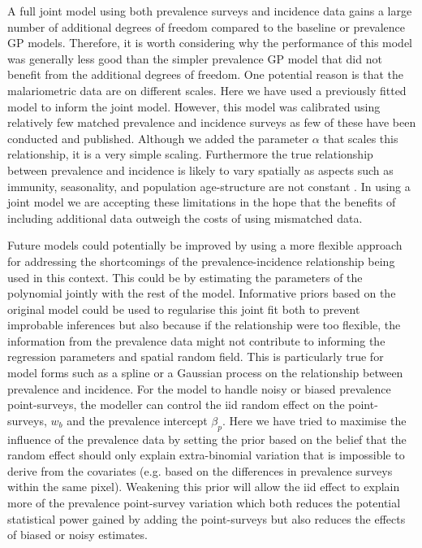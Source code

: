 \documentclass{statsoc}
\begin{document}

A full joint model using both prevalence surveys and incidence data gains a large number of additional degrees of freedom compared to the baseline or prevalence GP models.
Therefore, it is worth considering why the performance of this model was generally less good than the simpler prevalence GP model that did not benefit from the additional degrees of freedom.
One potential reason is that the malariometric data are on different scales.
Here we have used a previously fitted model \citep{cameron2015defining} to inform the joint model.
However, this model was calibrated using relatively few matched prevalence and incidence surveys as few of these have been conducted and published.
Although we added the parameter $\alpha$ that scales this relationship, it is a very simple scaling.
Furthermore the true relationship between prevalence and incidence is likely to vary spatially as aspects such as immunity, seasonality, and population age-structure are not constant \citep{cameron2015defining, battle2015defining, reiner2015seasonality}.
In using a joint model we are accepting these limitations in the hope that the benefits of including additional data outweigh the costs of using mismatched data.


Future models could potentially be improved by using a more flexible approach for addressing the shortcomings of the prevalence-incidence relationship \citep{cameron2015defining} being used in this context.
This could be by estimating the parameters of the polynomial jointly with the rest of the model.
Informative priors based on the original model could be used to regularise this joint fit both to prevent improbable inferences but also because if the relationship were too flexible, the information from the prevalence data might not contribute to informing the regression parameters and spatial random field.
This is particularly true for model forms such as a spline or a Gaussian process on the relationship between prevalence and incidence.
For the model to handle noisy or biased prevalence point-surveys, the modeller can control the iid random effect on the point-surveys, $w_b$ and the prevalence intercept $\beta_p$. 
Here we have tried to maximise the influence of the prevalence data by setting the prior based on the belief that the random effect should only explain extra-binomial variation that is impossible to derive from the covariates (e.g. based on the differences in prevalence surveys within the same pixel).
Weakening this prior will allow the iid effect to explain more of the prevalence point-survey variation which both reduces the potential statistical power gained by adding the point-surveys but also reduces the effects of biased or noisy estimates.
\end{document}

